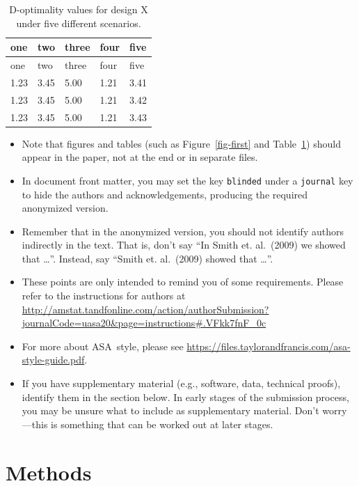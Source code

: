 \documentclass[
  12pt]{article}
\providecommand{\tightlist}{%
  \setlength{\itemsep}{0pt}\setlength{\parskip}{0pt}}\usepackage{longtable,booktabs,array}
\begin{document}
\hypertarget{tbl-one}{}
\begin{longtable}[]{@{}lllll@{}}
\caption{\label{tbl-one}D-optimality values for design X under five
different scenarios.}\tabularnewline
\toprule()
one & two & three & four & five \\
\midrule()
\endfirsthead
\toprule()
one & two & three & four & five \\
\midrule()
\endhead
1.23 & 3.45 & 5.00 & 1.21 & 3.41 \\
1.23 & 3.45 & 5.00 & 1.21 & 3.42 \\
1.23 & 3.45 & 5.00 & 1.21 & 3.43 \\
\bottomrule()
\end{longtable}

\begin{itemize}
\tightlist
\item
  Note that figures and tables (such as Figure~\ref{fig-first} and
  Table~\ref{tbl-one}) should appear in the paper, not at the end or in
  separate files.
\item
  In document front matter, you may set the key \texttt{blinded} under a
  \texttt{journal} key to hide the authors and acknowledgements,
  producing the required anonymized version.
\item
  Remember that in the anonymized version, you should not identify
  authors indirectly in the text. That is, don't say ``In Smith et.
  al.~(2009) we showed that \ldots{}''. Instead, say ``Smith et.
  al.~(2009) showed that \ldots{}''.
\item
  These points are only intended to remind you of some requirements.
  Please refer to the instructions for authors at
  \url{http://amstat.tandfonline.com/action/authorSubmission?journalCode=uasa20\&page=instructions\#.VFkk7fnF_0c}
\item
  For more about ASA~style, please see
  \url{https://files.taylorandfrancis.com/asa-style-guide.pdf}.
\item
  If you have supplementary material (e.g., software, data, technical
  proofs), identify them in the section below. In early stages of the
  submission process, you may be unsure what to include as supplementary
  material. Don't worry---this is something that can be worked out at
  later stages.
\end{itemize}

\hypertarget{sec-meth}{%
\section{Methods}\label{sec-meth}}
\end{document}
